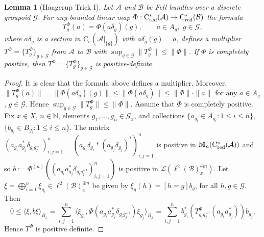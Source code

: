 \documentclass[11 pt, leqno]{amsart}
\numberwithin{equation}{section}
\theoremstyle{plain}
\newtheorem {lem} [thm]{Lemma}
\theoremstyle{definition}
\newcommand{\Mat}{\mathbb M} %
\newcommand*{\contc}{\mathrm{C_c}}%
\renewcommand{\star}{*}
\DeclareMathOperator{\red}{red}%
\newcommand{\B}{\mathcal B}
\newcommand{\G}{\mathcal G} %
\renewcommand{\L}{\mathcal L}
\newcommand{\A}{\mathcal A}
\newcommand{\N}{\mathbb N}
\newcommand{\cst}{\ifmmode\mathrm{C}^*\else{$\mathrm{C}^*$}\fi}
\begin{document}
\begin{lem}[Haagerup Trick I]\label{lem:Haagerup trick discrete}
Let $\A$ and $\B$ be Fell bundles over a discrete groupoid $\G$. 
For any bounded linear map $\Phi:\cst_{\red}(\A)\to \cst_{\red}(\B)$  
the formula  
\[
    T_{g}^{\Phi}(a)=\Phi(a\delta_g)(g), \qquad a\in  A_{g},\,\, g \in \G,
\]
where $a\delta_g$ is  a section in $\contc(\A|_{\{g\}})$ with $a\delta_g(g)=a$, defines a multiplier $T^{\Phi}=\{T_g^{\Phi}\}_{g\in \G}$ from $\A$ to $\B$ with $\sup_{g\in \G}\|T_{g}^{\Phi} \|\leq \|\Phi\|$. 
If $\Phi$ is completely positive, then $T^{\Phi}=\{T_g^{\Phi}\}_{g\in \G}$ is  positive-definite.  
\end{lem}
\begin{proof}
It is clear that the formula above defines a multiplier. 
Moreover, $\| T_{g}^{\Phi}(a) \| = \| \Phi(a\delta_g)(g) \| \leq \| \Phi(a\delta_g) \| \leq \| \Phi \| \cdot \| a \|$ for any $a \in A_{g}$, $g \in \G$. 
Hence $\sup_{g\in \G} \| T_{g}^{\Phi} \| \leq \| \Phi \|$. 
Assume that $\Phi$ is completely positive. 
Fix $x \in X$, $n \in \N$, elements $g_1 , \ldots , g_n \in \G_x$, and collections $\{ a_{g_i} \in A_{g_i} : 1 \leq i \leq n \}$, $\{b_{g_i} \in B_{g_i}: 1 \leq i \leq n \}$. 
The matrix $( a_{g_i} a_{g_j}^\star \delta_{g_i g_j^{-1}})_{i,j = 1}^n = (a_{g_i} \delta_{g_i} * (a_{g_j} \delta_{g_j})^*)_{i,j = 1}^n$ is positive in $\Mat_n(\cst_{\red}(\A))$ and so $b := \Phi^{(n)} ((a_{g_i} a_{g_j}^\star \delta_{g_i g_j^{-1}})_{i,j = 1}^n)$ is positive in $\L(\ell^2(\B)_{x}^{\oplus n})$. 
Let $\xi = \bigoplus_{i = 1}^n \xi_{g_i} \in \ell^2(\B)_{x}^{\oplus n}$ be given by $\xi_g(h)=[h=g] b_g$, for all $h,g \in \G$. 
Then 
\[ 
    0 \leq \langle \xi, b \xi \rangle_{B_x} = \sum_{i,j = 1}^n \langle \xi_{g_i} , \Phi ( a_{g_i} a_{g_j}^\star \delta_{g_i g_j^{-1}} ) \xi_{g_j} \rangle_{B_x} = \sum_{i,j = 1}^n b_{g_i}^{\star} \left( T_{g_i g_j^{-1}}^{\Phi} (a_{g_i}  a_{g_j}^{\star} ) \right) b_{g_j} . 
\]
Hence $T^{\Phi}$ is positive definite. 
\end{proof}
\end{document}
